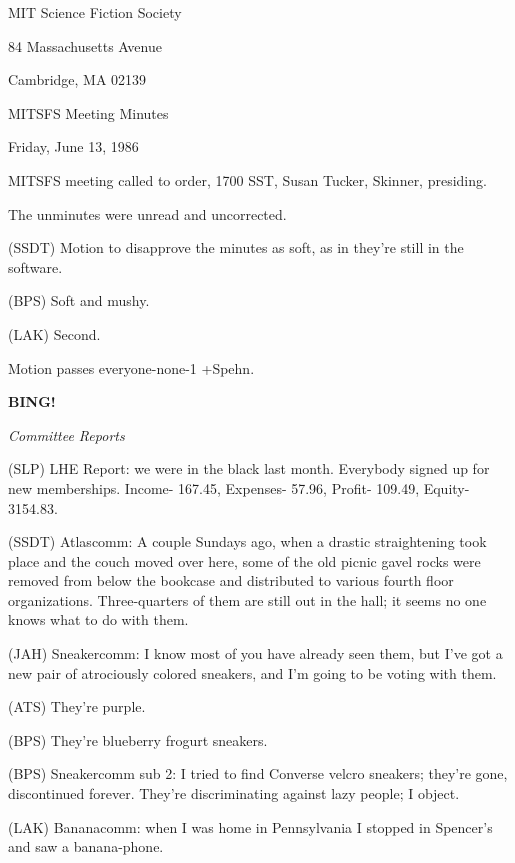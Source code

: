 \documentclass[12pt]{article}
\newcommand{\bing}{{\bf BING!} }
\newcommand{\goto}[1]{\bing \vskip 12pt \centerline{{\em{#1}}}}
\begin{document}
\begin{center}

MIT Science Fiction Society 

84 Massachusetts Avenue

Cambridge, MA 02139

\vspace{12pt}

MITSFS Meeting Minutes 

Friday, June 13, 1986

\end{center}
 
\vspace{18pt}

\setlength{\parskip}{6pt}

\noindent
MITSFS meeting called to order, 1700 SST,
Susan Tucker, Skinner, presiding.

The unminutes were unread and uncorrected.

(SSDT) Motion to disapprove the minutes as soft, as in they're still in the software.

(BPS) Soft and mushy.

(LAK) Second.

Motion passes everyone-none-1 +Spehn.

\goto{Committee Reports}

(SLP) LHE Report: we were in the black last month. Everybody signed up for new memberships. Income- 167.45, Expenses- 57.96, Profit- 109.49, Equity- 3154.83.

(SSDT) Atlascomm: A couple Sundays ago, when a drastic straightening took place and the couch moved over here, some of the old picnic gavel rocks were removed from below the bookcase and distributed to various fourth floor organizations. Three-quarters of them are still out in the hall; it seems no one knows what to do with them.

(JAH) Sneakercomm: I know most of you have already seen them, but I've got a new pair of atrociously colored sneakers, and I'm going to be voting with them.

(ATS) They're purple.

(BPS) They're blueberry frogurt sneakers.

(BPS) Sneakercomm sub 2: I tried to find Converse velcro sneakers; they're gone, discontinued forever. They're discriminating against lazy people; I object.

(LAK) Bananacomm: when I was home in Pennsylvania I stopped in Spencer's and saw a banana-phone.
\end{document}
